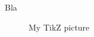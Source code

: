 \documentclass[a4paper,11pt]{article}
\begin{document}


\tableofcontents

\newpage




Bla

\begin{figure}
 \caption{My TikZ picture}
 \label{fig:tikz:particule1}
\end{figure}

\newpage

\cite{ref:FT_graph}


\end{document}
